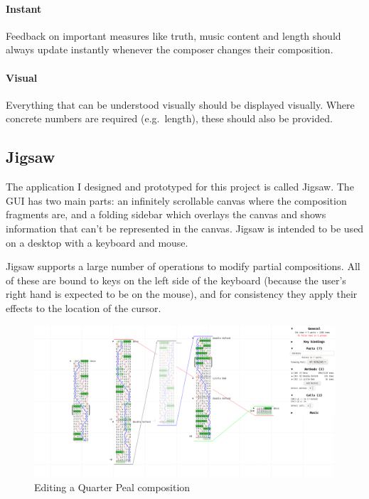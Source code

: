 \documentclass[12pt]{article}
\begin{document}
\paragraph{Instant} Feedback on important measures like truth, music content and length should
always update instantly whenever the composer changes their composition.

\paragraph{Visual} Everything that can be understood visually should be displayed visually.  Where
concrete numbers are required (e.g.\ length), these should also be provided.

\subsection{Jigsaw}

The application I designed and prototyped for this project is called Jigsaw.  The GUI has two main
parts: an infinitely scrollable canvas where the composition fragments are, and a folding sidebar
which overlays the canvas and shows information that can't be represented in the canvas.  Jigsaw is
intended to be used on a desktop with a keyboard and mouse.

Jigsaw supports a large number of operations to modify partial compositions.  All of these are bound
to keys on the left side of the keyboard (because the user's right hand is expected to be on the
mouse), and for consistency they apply their effects to the location of the cursor.

\begin{figure}
    \centering
    \includegraphics[width=\textwidth]{false-qp}
    \caption{Editing a Quarter Peal composition}\label{fig:cur-screenshot}
\end{figure}
\end{document}
